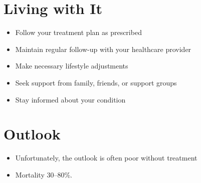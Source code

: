 \section{Living with It}
\begin{itemize}[noitemsep]
  \item Follow your treatment plan as prescribed
  \item Maintain regular follow-up with your healthcare provider
  \item Make necessary lifestyle adjustments
  \item Seek support from family, friends, or support groups
  \item Stay informed about your condition
\end{itemize}
\section{Outlook}
\begin{itemize}[noitemsep]
  \item Unfortunately, the outlook is often poor without treatment
  \item Mortality 30--80\%.
\end{itemize}
